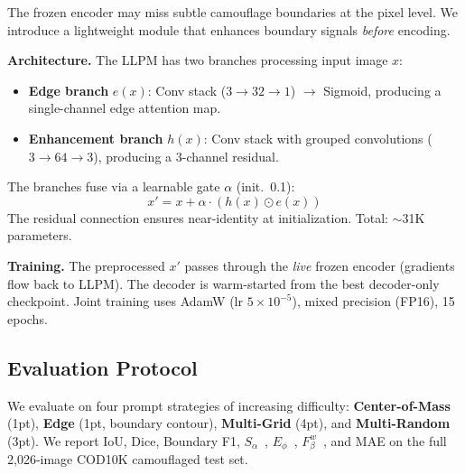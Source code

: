 The frozen encoder may miss subtle camouflage boundaries at the pixel level. We introduce a lightweight module that enhances boundary signals \emph{before} encoding.

\noindent\textbf{Architecture.} The LLPM has two branches processing input image $x$:
\begin{itemize}
    \item \textbf{Edge branch} $e(x)$: Conv stack ($3 \!\rightarrow\! 32 \!\rightarrow\! 1$) $\rightarrow$ Sigmoid, producing a single-channel edge attention map.
    \item \textbf{Enhancement branch} $h(x)$: Conv stack with grouped convolutions ($3 \!\rightarrow\! 64 \!\rightarrow\! 3$), producing a 3-channel residual.
\end{itemize}
The branches fuse via a learnable gate $\alpha$ (init.\ 0.1):
\begin{equation}
    x' = x + \alpha \cdot (h(x) \odot e(x))
    \label{eq:llpm}
\end{equation}
The residual connection ensures near-identity at initialization. Total: $\sim$31K parameters.

\noindent\textbf{Training.} The preprocessed $x'$ passes through the \emph{live} frozen encoder (gradients flow back to LLPM). The decoder is warm-started from the best decoder-only checkpoint. Joint training uses AdamW (lr $5\!\times\!10^{-5}$), mixed precision (FP16), 15 epochs.

\subsection{Evaluation Protocol}

We evaluate on four prompt strategies of increasing difficulty: \textbf{Center-of-Mass} (1pt), \textbf{Edge} (1pt, boundary contour), \textbf{Multi-Grid} (4pt), and \textbf{Multi-Random} (3pt). We report IoU, Dice, Boundary F1, $S_\alpha$~\cite{fan2017smeasure}, $E_\phi$~\cite{fan2018emeasure}, $F_\beta^w$~\cite{margolin2014fmeasure}, and MAE on the full 2,026-image COD10K camouflaged test set.
